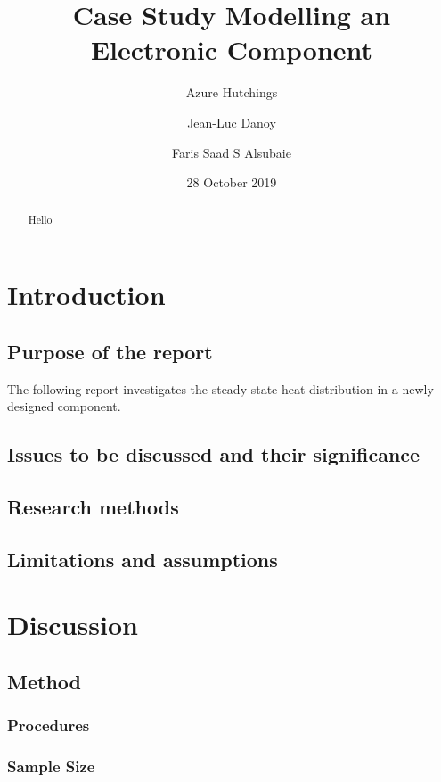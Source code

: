 \documentclass[12pt,twoside,a4paper]{article}
\title{Case Study Modelling an Electronic Component}
\author{
  Azure Hutchings
  \and
  Jean-Luc Danoy
  \and
  Faris Saad S Alsubaie
}
\date{28 October 2019}
\begin{document}
 
\begin{titlepage}
\maketitle
\end{titlepage}

\renewcommand{\abstractname}{Executive Summary}
\begin{abstract}
Hello
\end{abstract}

\tableofcontents

\section{Introduction}

\subsection{Purpose of the report}
The following report investigates the steady-state heat distribution in a newly designed component. 

\subsection{Issues to be discussed and their significance}

\subsection{Research methods}

\subsection{Limitations and assumptions}

\section{Discussion}

\subsection{Method}

\subsubsection{Procedures}

\subsubsection{Sample Size}
\end{document}

